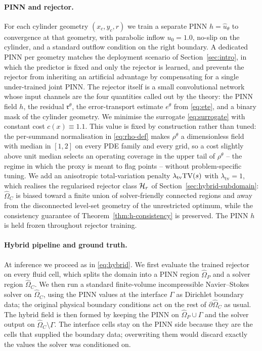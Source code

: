 \paragraph{PINN and rejector.}
For each cylinder geometry $(x_c,y_c,r)$ we train a separate PINN
$h=\widehat{u}_\theta$ to convergence at that geometry, with parabolic
inflow $u_0=1.0$, no-slip on the cylinder, and a standard outflow
condition on the right boundary. A dedicated PINN per geometry
matches the deployment scenario of Section~\ref{sec:intro}, in which
the predictor is fixed and only the rejector is learned, and prevents
the rejector from inheriting an artificial advantage by compensating
for a single under-trained joint PINN. The rejector itself is a small
convolutional network whose input channels are the four quantities
called out by the theory: the PINN field $h$, the residual
$\mathfrak{r}^\theta$, the error-transport estimate $e^\theta$ from
\eqref{eq:ete}, and a binary mask of the cylinder geometry. We
minimise the surrogate \eqref{eq:surrogate} with constant cost
$c(x)\equiv 1.1$. This value is fixed by construction rather than
tuned: the per-summand normalisation in \eqref{eq:rho-def} makes
$\rho^\theta$ a dimensionless field with median in $[1,2]$ on every
PDE family and every grid, so a cost slightly above unit median
selects an operating coverage in the upper tail of $\rho^\theta$ -- the
regime in which the proxy is meant to flag points -- without
problem-specific tuning. We add an anisotropic total-variation
penalty $\lambda_{\mathrm{tv}}\mathrm{TV}(s)$ with $\lambda_{\mathrm{tv}}=1$,
which realises the regularised rejector class $\mathcal{H}_r$ of
Section~\ref{sec:hybrid-subdomain}: $\widehat{\Omega}_C$ is biased
toward a finite union of solver-friendly connected regions and away
from the disconnected level-set geometry of the unrestricted optimum,
while the consistency guarantee of Theorem~\ref{thm:h-consistency}
is preserved. The PINN $h$ is held frozen throughout rejector training.

\paragraph{Hybrid pipeline and ground truth.}
At inference we proceed as in \eqref{eq:hybrid}. We first evaluate
the trained rejector on every fluid cell, which splits the domain
into a PINN region $\widehat{\Omega}_P$ and a solver region
$\widehat{\Omega}_C$. We then run a standard finite-volume
incompressible Navier--Stokes solver
\citep{leveque2007finite,brenner2008mathematical} on
$\widehat{\Omega}_C$, using the PINN values at the interface
$\Gamma$ as Dirichlet boundary data; the original physical boundary
conditions act on the rest of $\partial\widehat{\Omega}_C$ as usual.
The hybrid field is then formed by keeping the PINN on
$\widehat{\Omega}_P\cup\Gamma$ and the solver output on
$\widehat{\Omega}_C\setminus\Gamma$. The interface cells stay on
the PINN side because they are the cells that supplied the boundary
data; overwriting them would discard exactly the values the solver
was conditioned on.

